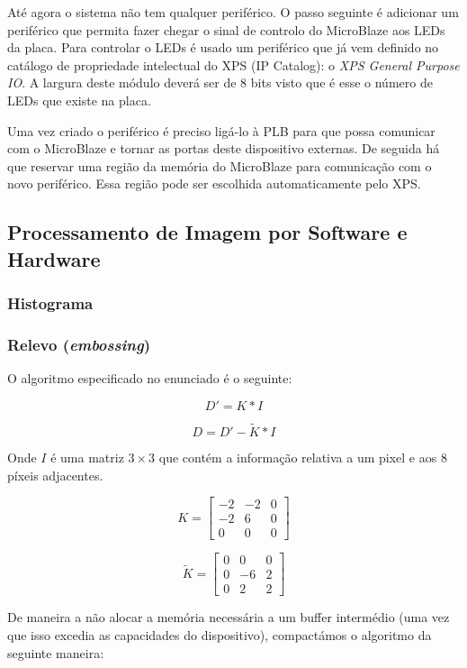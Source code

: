 \documentclass[a4paper]{article}
\begin{document}
Até agora o sistema não tem qualquer periférico. O passo seguinte é adicionar um periférico que permita fazer chegar o sinal de controlo do MicroBlaze aos LEDs da placa. Para controlar o LEDs é usado um periférico que já vem definido no catálogo de propriedade intelectual do XPS (IP Catalog): o \textit{XPS General Purpose IO}. A largura deste módulo deverá ser de 8 bits visto que é esse o número de LEDs que existe na placa.

Uma vez criado o periférico é preciso ligá-lo à PLB para que possa comunicar com o MicroBlaze e tornar as portas deste dispositivo externas. De seguida há que reservar uma região da memória do MicroBlaze para comunicação com o novo periférico. Essa região pode ser escolhida automaticamente pelo XPS.

\subsection{Processamento de Imagem por Software e Hardware}
\subsubsection{Histograma}


\subsubsection{Relevo (\textit{embossing})}

O algoritmo especificado no enunciado é o seguinte:

\[
D' = K \ast I
\]

\[
D = D' - \widetilde{K} \ast I
\]

Onde $I$ é uma matriz $3 \times 3$ que contém a informação relativa a um pixel e aos 8 píxeis adjacentes.

\[ K =
\begin{bmatrix}
-2 & -2 & 0\\
-2 & 6 & 0\\
0 & 0 & 0
\end{bmatrix}
\]

\[\widetilde{K} = 
\begin{bmatrix}
0&0&0\\
0&-6&2\\
0&2&2
\end{bmatrix}
\]

De maneira a não alocar a memória necessária a um buffer intermédio (uma vez que isso excedia as capacidades do dispositivo), compactámos o algoritmo da seguinte maneira:
\end{document}
